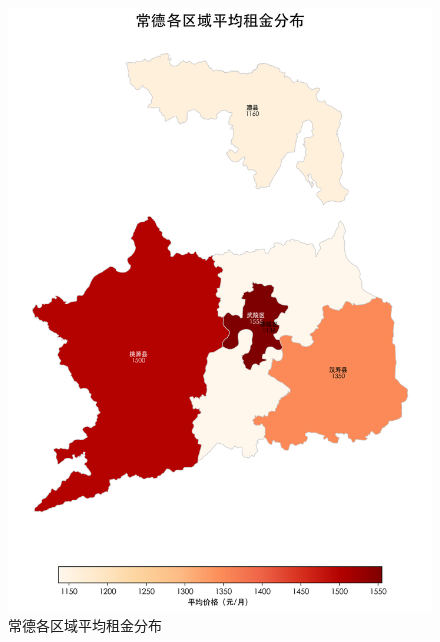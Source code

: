 \begin{figure}[htbp]
    \centering
    \includegraphics[width=0.7\linewidth]{../../figure/changde_region_heat_map.png}
    \caption{常德各区域平均租金分布}
    \label{fig:changde_region_heat_map}
\end{figure}

